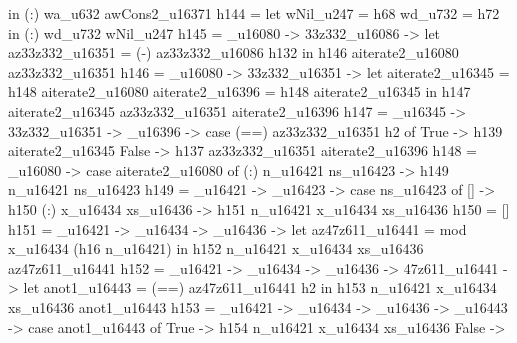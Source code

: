                 in (:) wa_u632 awCons2_u16371
         h144 = let
                  wNil_u247 = h68
                  wd_u732 = h72
                in (:) wd_u732 wNil_u247
         h145 = _u16080 -> \az33z332_u16086 -> let
                                                           az33z332_u16351 = (-) az33z332_u16086 h132
                                                         in h146 aiterate2_u16080 az33z332_u16351
         h146 = _u16080 -> \az33z332_u16351 -> let
                                                           aiterate2_u16345 = h148 aiterate2_u16080
                                                           aiterate2_u16396 = h148 aiterate2_u16345
                                                         in h147 aiterate2_u16345 az33z332_u16351 aiterate2_u16396
         h147 = _u16345 -> \az33z332_u16351 -> _u16396 -> case (==) az33z332_u16351 h2 of
                                                                                True ->
                                                                                  h139 aiterate2_u16345
                                                                                False ->
                                                                                  h137 az33z332_u16351 aiterate2_u16396
         h148 = _u16080 -> case aiterate2_u16080 of
                                       (:) n_u16421 ns_u16423 -> h149 n_u16421 ns_u16423
         h149 = \n_u16421 -> \ns_u16423 -> case ns_u16423 of
                                             [] -> h150
                                             (:) x_u16434 xs_u16436 -> h151 n_u16421 x_u16434 xs_u16436
         h150 = []
         h151 = \n_u16421 -> \x_u16434 -> \xs_u16436 -> let
                                                          az47z611_u16441 = mod x_u16434 (h16 n_u16421)
                                                        in h152 n_u16421 x_u16434 xs_u16436 az47z611_u16441
         h152 = \n_u16421 -> \x_u16434 -> \xs_u16436 -> \az47z611_u16441 -> let
                                                                              anot1_u16443 = (==) az47z611_u16441 h2
                                                                            in h153 n_u16421 x_u16434 xs_u16436 anot1_u16443
         h153 = \n_u16421 -> \x_u16434 -> \xs_u16436 -> _u16443 -> case anot1_u16443 of
                                                                           True ->
                                                                             h154 n_u16421 x_u16434 xs_u16436
                                                                           False ->
